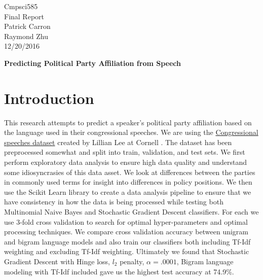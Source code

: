 \documentclass[a4paper, 12pt]{article}
\begin{document}
\noindent
Cmpsci585\\
Final Report\\
Patrick Carron \\
Raymond Zhu\\
12/20/2016 \\
\begin{center}

\textbf{Predicting Political Party Affiliation from Speech}
\end{center}

	
	\section{Introduction}
	
	This research attempts to predict a speaker's political party affiliation based on the language used in their congressional speeches. We are using the \href{http://www.cs.cornell.edu/home/llee/data/convote.html}{Congressional speeches dataset} created by Lillian Lee at Cornell \cite{thomas2006get}. The dataset has been preprocessed somewhat and split into train, validation, and test sets.  We first perform exploratory data analysis to ensure high data quality and understand some idiosyncrasies of this data asset. We look at differences between the parties in commonly used terms for insight into differences in policy positions. We then use the \cite{pedregosa2011scikit} Scikit Learn library to create a data analysis pipeline to ensure that we have consistency in how the data is being processed while testing both Multinomial Naive Bayes and Stochastic Gradient Descent classifiers.  For each we use 3-fold cross validation to search for optimal hyper-parameters and optimal processing techniques.  We compare cross validation accuracy between unigram and bigram language models and also train our classifiers both including Tf-Idf weighting and excluding Tf-Idf weighting. Ultimately we found that Stochastic Gradient Descent with Hinge loss, $l_2$ penalty, $\alpha=.0001$,  Bigram language modeling with Tf-Idf included gave us the highest test accuracy at 74.9\%.
	
\end{document}
